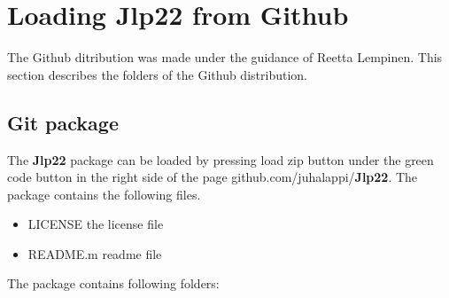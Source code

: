 \section{ Loading \textbf{Jlp22} from Github} 
\label{git} 
The Github ditribution was made under the guidance of Reetta Lempinen. This section describes the 
folders of the Github distribution. 
\subsection{Git package} 
\label{gitpack} 
The \textbf{Jlp22}  package can be loaded by pressing load zip button under the green 
code button in the right side of the page github.com/juhalappi/\textbf{Jlp22}.  The package 
contains the following files. 
 
\begin{itemize} 
\item LICENSE the license file 
\item README.m readme file 
\end{itemize} 
 
The package contains following folders: 
 
